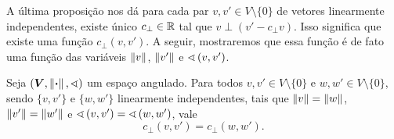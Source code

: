 A última proposição nos dá para cada par $v,v' \in V \setminus \{0\}$ de vetores linearmente independentes, existe único $c_{\perp} \in \mathbb{R}$ tal que $v \perp (v'-c_\perp v)$. Isso significa que existe uma função $c_{\perp}(v,v')$. A seguir, mostraremos que essa função é de fato uma função das variáveis $\left\Vert{v}\right\Vert$, $\left\Vert{v'}\right\Vert$ e $\sphericalangle\left({v},{v'}\right)$.

\begin{proposition}
\label{prop:geo.cperpfuncaonormaangulo}
Seja $(\bm V, \left\Vert{\bm{\cdot}}\right\Vert,\sphericalangle)$ um espaço angulado. Para todos $v,v' \in V \setminus \{0\}$ e $w,w' \in V \setminus \{0\}$, sendo $\{v,v'\}$ e $\{w,w'\}$ linearmente independentes, tais que $\left\Vert{v}\right\Vert=\left\Vert{w}\right\Vert$, $\left\Vert{v'}\right\Vert=\left\Vert{w'}\right\Vert$ e $\sphericalangle\left({v},{v'}\right) = \sphericalangle\left({w},{w'}\right)$, vale
	\begin{equation*}
	c_{\perp}(v,v') = c_{\perp}(w,w').
	\end{equation*}
\end{proposition}
